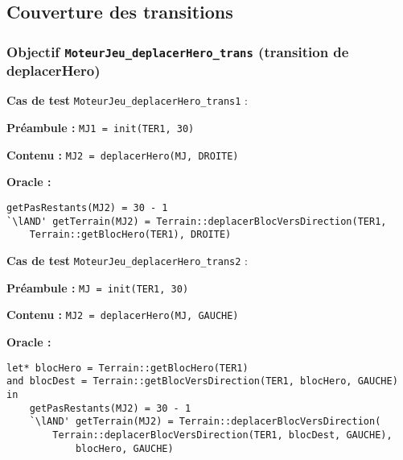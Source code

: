 \documentclass{article}
\newcommand{\cmd}[1]{\texttt{#1}}
\newcommand{\lAND}{$\land$}
\newcommand{\obj}[2]{\subsubsection*{\large{\textbf{Objectif {\cmd{#1} (#2)}}}}}
\newenvironment{cas}[1]
{
	\hspace{1em}\textbf{Cas de test} \cmd{#1} :
	\begin{list}{}{}
}{
	\end{list}\vspace{1em}
}
\newcommand{\pre}[1]{\item \textbf{Préambule :} \cmd{#1}}
\newcommand{\ope}[1]{\item \textbf{Contenu :} \cmd{#1}}
\newcommand{\oram}{\item \textbf{Oracle :}}
\begin{document}
\subsection{Couverture des transitions}

\obj{MoteurJeu\_deplacerHero\_trans} {transition de deplacerHero}
	\begin{cas} {MoteurJeu\_deplacerHero\_trans1}
		\pre{MJ1 = init(TER1, 30)}
		\ope{MJ2 = deplacerHero(MJ, DROITE)}
		\oram{}
		\begin{lstlisting}
getPasRestants(MJ2) = 30 - 1
`\lAND' getTerrain(MJ2) = Terrain::deplacerBlocVersDirection(TER1,
	Terrain::getBlocHero(TER1), DROITE)
		\end{lstlisting}
	\end{cas}

	\begin{cas} {MoteurJeu\_deplacerHero\_trans2}
		\pre{MJ = init(TER1, 30)}
		\ope{MJ2 = deplacerHero(MJ, GAUCHE)}
		\oram{}
		\begin{lstlisting}
let* blocHero = Terrain::getBlocHero(TER1)
and blocDest = Terrain::getBlocVersDirection(TER1, blocHero, GAUCHE)
in
	getPasRestants(MJ2) = 30 - 1
	`\lAND' getTerrain(MJ2) = Terrain::deplacerBlocVersDirection(
		Terrain::deplacerBlocVersDirection(TER1, blocDest, GAUCHE),
			blocHero, GAUCHE)
		\end{lstlisting}
	\end{cas}
\end{document}
